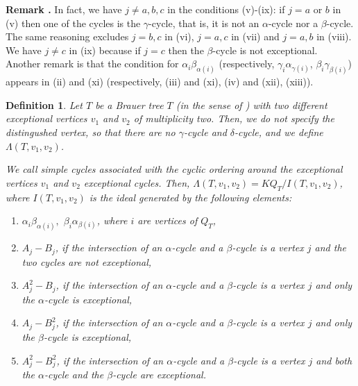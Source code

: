 \documentclass[12pt]{amsart}
\newtheorem{definition}[thm]{Definition}
\def \remark{\refstepcounter{thm} \par\medskip\noindent
                \textbf{Remark \thethm .} }
\numberwithin{equation}{thm}
\newcounter{ni}
\begin{document}
\remark
In fact, we have $j\ne a, b, c$ in the conditions (v)-(ix): if $j=a$ or $b$ in (v) then one of the cycles is the $\gamma$-cycle, that is, 
it is not an $\alpha$-cycle nor a $\beta$-cycle. The same reasoning excludes $j=b, c$ in (vi), $j=a, c$ in (vii) and $j=a, b$ in (viii). 
We have $j\ne c$ in (ix) because if $j=c$ then the $\beta$-cycle is not exceptional. 
Another remark is that the condition for 
$\alpha_i\beta_{\alpha(i)}$ (respectively, $\gamma_i\alpha_{\gamma(i)}$, $\beta_i\gamma_{\beta(i)}$) appears in (ii) and (xi) 
(respectively, (iii) and (xi), (iv) and (xii), (xiii)).

\begin{definition}\label{D defn IV}
Let $T$ be a Brauer tree  $T$ (in the sense of \cite[Proposition 5.3]{KX1}) with two different exceptional vertices $v_{1}$ and  $v_{2}$ of multiplicity two. 
Then, we do not specify the distingushed vertex, so that there are no $\gamma$-cycle and $\delta$-cycle, 
and we define $\Lambda(T,v_{1},v_{2})$.

We call simple cycles associated with the cyclic ordering around the exceptional vertices $v_{1}$ and $v_{2}$ 
\emph{exceptional cycles}. Then, $\Lambda(T,v_{1},v_{2}) = KQ_T/I(T,v_{1},v_{2})$, 
where $I(T,v_{1},v_{2})$ is the ideal generated by the following elements:
\begin{enumerate}
\item $\alpha_{i}\beta_{\alpha(i)},$ $\beta_{i}\alpha_{\beta(i)}$, where $i$ are vertices of $Q_{T}$,
\item $A_j-B_j$, if the intersection of an $\alpha$-cycle and a $\beta$-cycle is a vertex $j$ and 
the two cycles are not exceptional,
\item $A_j^{2}-B_j$, if the intersection of an $\alpha$-cycle and a $\beta$-cycle is a vertex $j$ and 
only the $\alpha$-cycle is exceptional, 
\item $A_j-B_j^{2}$, if the intersection of an $\alpha$-cycle and a $\beta$-cycle is a vertex $j$ and 
only the $\beta$-cycle is exceptional,
\item $A_j^{2}-B_j^{2}$, if the intersection of an $\alpha$-cycle and a $\beta$-cycle is a vertex $j$ and 
both the $\alpha$-cycle and the $\beta$-cycle are exceptional.
\end{enumerate}
\end{definition}
\end{document}
